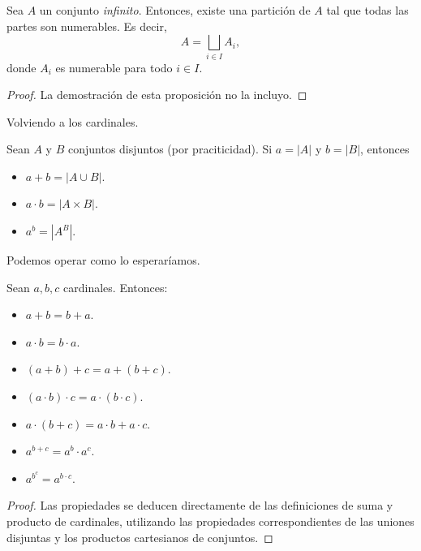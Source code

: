 \begin{proposition}
    Sea $A$ un conjunto \textit{infinito}. Entonces, existe una partición de $A$ tal que todas las partes son numerables. Es decir,
    $$
        A = \bigsqcup_{i \in I} A_i,
    $$
    donde $A_i$ es numerable para todo $i \in I$.
\end{proposition}

\begin{proof}
    {\color{red} La demostración de esta proposición no la incluyo.}
\end{proof}

Volviendo a los cardinales.

\begin{definition}
    Sean $A$ y $B$ conjuntos disjuntos (por praciticidad). Si $a = \lvert A \rvert$ y $b = \lvert B \rvert$, entonces
    \begin{itemize}
        \item $a + b = |A \cup B|$.
        \item $a \cdot b = |A \times B|$.
        \item $a^{b} = |A^{B}|$.
    \end{itemize}
\end{definition}

Podemos operar como lo esperaríamos.

\begin{proposition}
    Sean $a, b, c$ cardinales. Entonces:
    \begin{itemize}
        \item $a + b = b + a$.
        \item $a \cdot b = b \cdot a$.
        \item $(a + b) + c = a + (b + c)$.
        \item $(a \cdot b) \cdot c = a \cdot (b \cdot c)$.
        \item $a \cdot (b + c) = a \cdot b + a \cdot c$.
        \item $a^{b+c} = a^{b} \cdot a^{c}$.
        \item $a^{b^{c}} = a^{b \cdot c}$.
    \end{itemize}
\end{proposition}

\begin{proof}
    Las propiedades se deducen directamente de las definiciones de suma y producto de cardinales, utilizando las propiedades correspondientes de las uniones disjuntas y los productos cartesianos de conjuntos.
\end{proof}